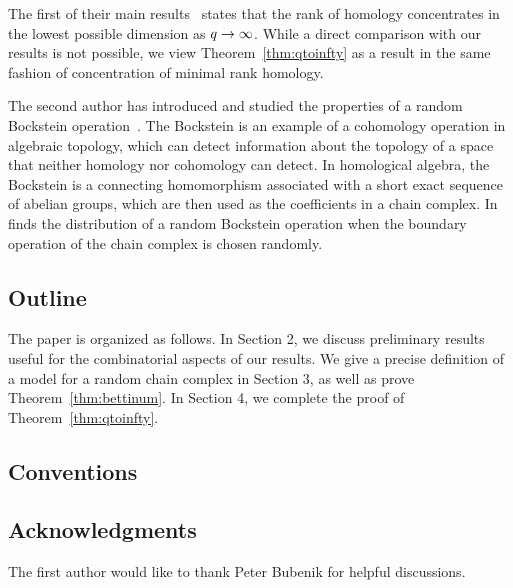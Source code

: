 The first of their main results~\cite[Thm 2.1]{ginzburg2017random} states that
the rank of homology concentrates in the lowest possible dimension as $q \rightarrow \infty$.  While a direct comparison with
our results is not possible, we view Theorem~\ref{thm:qtoinfty} as a result in the
same fashion of concentration of minimal rank homology. 


The second author has introduced and studied the
properties of a random Bockstein operation~\cite{zabka2018random}. The Bockstein is an example of a
cohomology operation in algebraic topology, which can detect information about the topology of a
space that neither homology nor cohomology can detect. In homological algebra,
the Bockstein is a connecting homomorphism associated with a short exact
sequence of abelian groups, which are then used as the coefficients in a chain
complex. In~\cite[Thm 5.2]{zabka2018random} finds the distribution of a random Bockstein operation when the boundary operation of the chain complex is chosen randomly. 

\subsection*{Outline}
  The paper is organized as follows. In Section 2, we discuss preliminary results useful for 
  the combinatorial aspects of our results. We give a precise definition of a model for a 
  random chain complex in Section 3, as well as prove
  Theorem~\ref{thm:bettinum}. In Section 4, we complete the proof of Theorem~\ref{thm:qtoinfty}.

\subsection*{Conventions}
 

\subsection*{Acknowledgments} The first author would like to thank Peter Bubenik for helpful discussions. 
